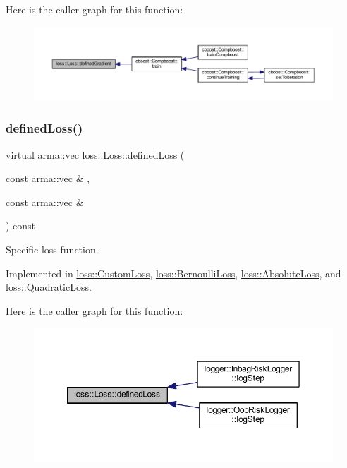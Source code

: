 Here is the caller graph for this function\+:\nopagebreak
\begin{figure}[H]
\begin{center}
\leavevmode
\includegraphics[width=350pt]{classloss_1_1_loss_a267a4de70747ade4b2d84ce35a448979_icgraph}
\end{center}
\end{figure}
\mbox{\label{classloss_1_1_loss_ae9f94dd9b8311397583ba3a9cb485e94}} 
\subsubsection{\texorpdfstring{defined\+Loss()}{definedLoss()}}
{\footnotesize\ttfamily virtual arma\+::vec loss\+::\+Loss\+::defined\+Loss (\begin{DoxyParamCaption}\item[{const arma\+::vec \&}]{,  }\item[{const arma\+::vec \&}]{ }\end{DoxyParamCaption}) const\hspace{0.3cm}{\ttfamily [pure virtual]}}



Specific loss function. 



Implemented in \mbox{\hyperlink{classloss_1_1_custom_loss_a2a96bc5e4b4894bbaa64745a3f7c0fd5}{loss\+::\+Custom\+Loss}}, \mbox{\hyperlink{classloss_1_1_bernoulli_loss_a1e347cacc5a5925874f579834f421236}{loss\+::\+Bernoulli\+Loss}}, \mbox{\hyperlink{classloss_1_1_absolute_loss_acfef6f0de3cfcccebd4bbfc04133cf1e}{loss\+::\+Absolute\+Loss}}, and \mbox{\hyperlink{classloss_1_1_quadratic_loss_ae34f68243ffe021e309ed73a68796e1e}{loss\+::\+Quadratic\+Loss}}.

Here is the caller graph for this function\+:\nopagebreak
\begin{figure}[H]
\begin{center}
\leavevmode
\includegraphics[width=350pt]{classloss_1_1_loss_ae9f94dd9b8311397583ba3a9cb485e94_icgraph}
\end{center}
\end{figure}


